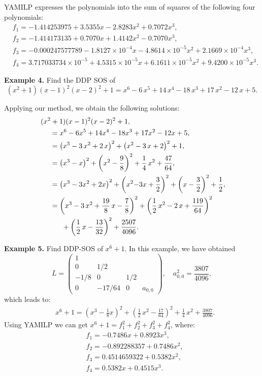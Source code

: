 \documentclass[runningheads]{llncs}
\begin{document}
{YAMILP expresses the polynomials into the sum of squares of the following four polynomials:
\begin{align*}
&f_1 = -1.414253975\! +\! 3.5355  x\! -\! 2.8283  x^2\!+\! 0.7072  x^3,\\
&f_2 = -1.414173135\! +\! 0.7070  x\! +\! 1.4142  x^2\!-\! 0.7070  x^3,\\
&f_3 = -0.000247577789\! -\! 1.8127\!\times\! 10^{-4}  x \!-\! 4.8614\!\times\! 10^{-5}  x^2\!+\! 2.1669\!\times\! 10^{-4}  x^3,\\
&f_4 = 3.717033734\times 10^{-5} \!+\! 4.5315\!\times\! 10^{-5}  x\! +\! 6.1611\!\times\! 10^{- 5}  x^2\!+\! 9.4200\times 10^{-5}  x^3.
\end{align*}

{\bf Example 4. } Find the DDP SOS of  
$$
(x^2+1)(x-1)^2(x-2)^2+1={x}^{6}-6\,{x}^{5}+14\,{x}^{4}-18\,{x}^{3}+17\,{x}^{2}-12\,x+5.
$$

Applying our method, we obtain the following solutions:
\begin{align}\label{eq-special-1}
&
~~~~(x^2+1)(x-1)^2(x-2)^2+1,\notag\\
&~~~~~~~~=x^6-6x^5+14x^4-18x^3+17x^2-12x+5,\notag\\
&~~~~~~~~=
\left ({x}^{3}-3\,{x}^{2}+2\,x\right )^{2}+\left ({x}^{2}-3\,x+2
\right )^{2}+1,\\
&~~~~~~~~=\left( {x}^{3}-x \right) ^{2}+ \left( {x}^{2}-{\frac{9}{8}} \right) ^
{2}+\frac{1}{4}\,{x}^{2}+{\frac{47}{64}},\\
&~~~~~~~~ = \left(x^3-3x^2+2x\right)^2+\left(x^2{-3}x+\frac{3}{2}\right)^2+\left(x-\frac{3}{2}\right)^2+\frac{1}{2}, &
\\
&~~~~~~~~=\left (
{x}^{3}-3\,{x}^{2}+{\frac {19}{8}}\,x-{\frac {7}{8}}\right )^{2}+
\left (\frac{1}{2}\,{x}^{2}-2\,x+{\frac {119}{64}}\right )^{2}\nonumber \\
&~~~~~~~~\phantom{=x}+\left (\frac{1}{2}\,x-{
\frac {13}{32}}\right )^{2}+{\frac {2507}{4096}}.
\end{align}

{\bf Example 5. }
Find DDP-SOS of ${x}^{6}+1$.
In this example, we have obtained 
$$
L=\left(\begin{array}{cccc}
1&&&\\
0&1/2&&\\
-1/8&0&1/2&\\
0&-17/64&0&a_{0,0}
\end{array}\right),
\quad
a_{0,0}^2=\frac{3807}{4096},
$$
which leads to:
\begin{align}\label{eq-00008-0-01}
&
~~~~{x}^{6}+1= \left( {x}^{3}-\frac{1}{8}x \right) ^{2}+ \left( \frac{1}{2}\,{x}^{2}-{\frac
{17}{64}} \right) ^{2}+\frac{1}{4}\,{x}^{2}+{\frac{3807}{4096}}.
&
\end{align}
Using YAMILP we can get $x^6+1=f_1^2+f_2^2+f_3^2+f_4^2$, where:
\begin{align*}
&f_1 = -0.7486  x + 0.8923  x^3,\\
&f_2 = -0.892288357 + 0.7486  x^2,\\
&f_3 = 0.4514659322 + 0.5382  x^2,\\
&f_4 = 0.5382  x + 0.4515  x^3.
\end{align*}

}
\end{document}

